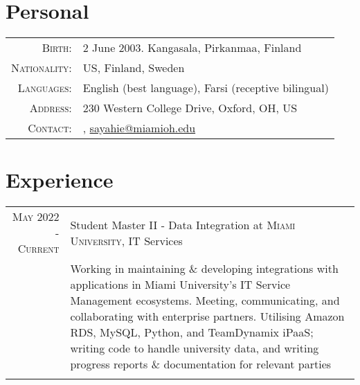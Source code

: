 \documentclass[letterpaper,10pt]{article} %
\begin{document}
\pagestyle{empty} %


\par{{\bigskip\par} %

\section{Personal}

\footnotesize{\begin{tabular}{rl}
\textsc{Birth:} & 2 June 2003. Kangasala, Pirkanmaa, Finland \\
\textsc{Nationality:} & US, Finland, Sweden \\
\textsc{Languages:} & English (best language), Farsi (receptive bilingual)\\
\textsc{Address:} & 230 Western College Drive, Oxford, OH, US \\
\textsc{Contact:} & \href{tel:+1-513-484-0972}{\color{black}{+1 (513) 484-0972}}, \href{mailto:sayahie@miamioh.edu}{\color{black}sayahie@miamioh.edu}\\
\end{tabular}}\normalsize


\section{Experience}

\begin{tabular}{r|p{11cm}}
\textsc{May 2022 - Current} & Student Master II - Data Integration at \textsc{Miami University}, IT Services \emph{}\\
& \footnotesize{Working in maintaining \& developing integrations with applications in Miami University's IT Service Management ecosystems. Meeting, communicating, and collaborating with enterprise partners.
Utilising Amazon RDS, MySQL, Python, and TeamDynamix iPaaS; writing code to handle university data, and writing progress reports \& documentation for relevant parties}\\
\multicolumn{2}{c}{} \\


\end{tabular}}
\end{document}

